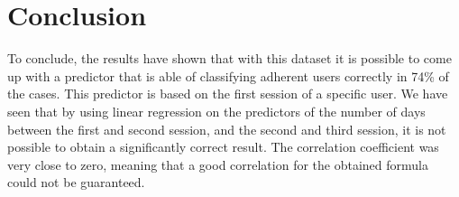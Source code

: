 \section{Conclusion}
To conclude, the results have shown that with this dataset it is possible to come up with a predictor that is able of classifying adherent users correctly in 74\% of the cases. This predictor is based on the first session of a specific user. We have seen that by using linear regression on the predictors of the number of days between the first and second session, and the second and third session, it is not possible to obtain a significantly correct result. The correlation coefficient was very close to zero, meaning that a good correlation for the obtained formula could not be guaranteed.
